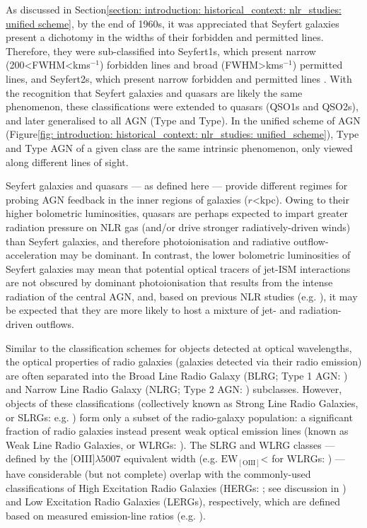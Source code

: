 As discussed in Section\;\ref{section: introduction: historical_context: nlr_studies: unified scheme}, by the end of 1960s, it was appreciated that Seyfert galaxies present a dichotomy in the widths of their forbidden and permitted lines. Therefore, they were sub-classified into Seyfert\;1s, which present narrow (200\;\textless\;FWHM\;\textless{}\;km\;s$^{-1}$) forbidden lines and broad (FWHM\;\textgreater{}\;km\;s$^{-1}$) permitted lines, and Seyfert\;2s, which present narrow forbidden and permitted lines \citep{Khachikian1971}. With the recognition that Seyfert galaxies and quasars are likely the same phenomenon, these classifications were extended to quasars (QSO1s and QSO2s), and later generalised to all AGN (Type and Type). In the unified scheme of AGN (Figure\;\ref{fig: introduction: historical_context: nlr_studies: unified_scheme}), Type and Type AGN of a given class are the same intrinsic phenomenon, only viewed along different lines of sight.

Seyfert galaxies and quasars --- as defined here --- provide different regimes for probing AGN feedback in the inner regions of galaxies ($r$\;\textless{}\;kpc). Owing to their higher bolometric luminosities, quasars are perhaps expected to impart greater radiation pressure on NLR gas (and/or drive stronger radiatively-driven winds) than Seyfert galaxies, and therefore photoionisation and radiative outflow-acceleration may be dominant. In contrast, the lower bolometric luminosities of Seyfert galaxies may mean that potential optical tracers of jet-ISM interactions are not obscured by dominant photoionisation that results from the intense radiation of the central AGN, and, based on previous NLR studies (e.g. \citealt{Whittle1992a, Axon1998, Crenshaw2000_N1068, Das2007}), it may be expected that they are more likely to host a mixture of jet- and radiation-driven outflows.

Similar to the classification schemes for objects detected at optical wavelengths, the optical properties of radio galaxies (galaxies detected via their radio emission) are often separated into the Broad Line Radio Galaxy (BLRG; Type 1 AGN: \citealt{Osterbrock1976, Grandi1977}) and Narrow Line Radio Galaxy (NLRG; Type 2 AGN: \citealt{Costero1977}) subclasses. However, objects of these classifications (collectively known as Strong Line Radio Galaxies, or SLRGs: e.g. \citealt{RamosAlmeida2011}) form only a subset of the radio-galaxy population: a significant fraction of radio galaxies instead present weak optical emission lines (known as Weak Line Radio Galaxies, or WLRGs: \citealt{HineLongair1979, Best2012}). The SLRG and WLRG classes --- defined by the [OIII]$\lambda5007$ equivalent width (e.g. $\mathrm{EW}_\mathrm{[OIII]}$\;\textless{}\;{\AA} for WLRGs: \citealt{Tadhunter1998}) --- have considerable (but not complete) overlap with the commonly-used classifications of High Excitation Radio Galaxies (HERGs: \citealt{Laing1994, Tadhunter1998, Best2012}; see discussion in \citealt{Tadhunter2016}) and Low Excitation Radio Galaxies (LERGs), respectively, which are defined based on measured emission-line ratios (e.g. \citealt{Buttiglione2010}).

